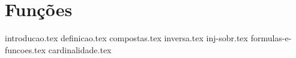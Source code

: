 \chapter{Funções}
{
    \newcommand{\chapterdir}{../capitulos/funcoes/}
    
    {introducao.tex}
    {definicao.tex}
    {compostas.tex}
    {inversa.tex}
    {inj-sobr.tex}
    {formulas-e-funcoes.tex}
    {cardinalidade.tex}
}